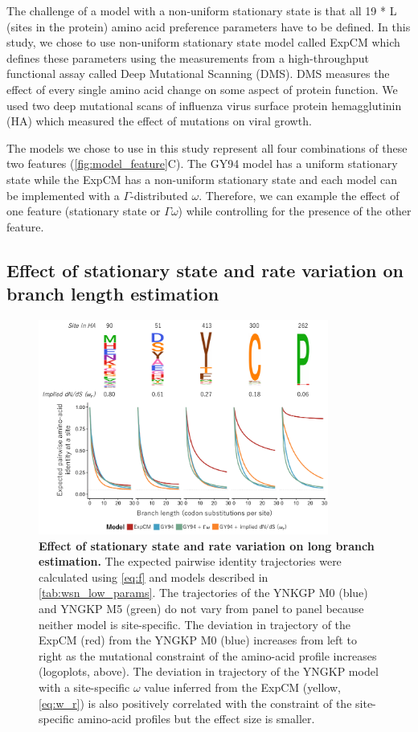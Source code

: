 \documentclass[11pt]{article}
\begin{document}
The challenge of a model with a non-uniform stationary state is that all 19 * L (sites in the protein) amino acid preference parameters have to be defined. 
In this study, we chose to use non-uniform stationary state model called ExpCM which defines these parameters using the measurements from a high-throughput functional assay called Deep Mutational Scanning (DMS). 
DMS measures the effect of every single amino acid change on some aspect of protein function. 
We used two deep mutational scans of influenza virus surface protein hemagglutinin (HA) which measured the effect of mutations on viral growth. 

The models we chose to use in this study represent all four combinations of these two features (\ref{fig:model_feature}C). 
The GY94 model has a uniform stationary state while the ExpCM has a non-uniform stationary state and each model can be implemented with a $\Gamma$-distributed $\omega$. 
Therefore, we can example the effect of one feature (stationary state or $\Gamma\omega$) while controlling for the presence of the other feature. 

\subsection*{Effect of stationary state and rate variation on branch length estimation}

\begin{figure}[H]
\centerline{\includegraphics[width=0.85\textwidth]{figures/decay.pdf}}
\caption{\label{fig:decay}
\textbf{Effect of stationary state and rate variation on long branch estimation.}
The expected pairwise identity trajectories were calculated using \ref{eq:f} and models described in \ref{tab:wsn_low_params}.
The trajectories of the YNKGP M0 (blue) and YNGKP M5 (green) do not vary from panel to panel because neither model is site-specific. 
The deviation in trajectory of the ExpCM (red) from the YNGKP M0 (blue) increases from left to right as the mutational constraint of the amino-acid profile increases (logoplots, above). 
The deviation in trajectory of the YNGKP model with a site-specific $\omega$ value inferred from the ExpCM (yellow, \ref{eq:w_r}) is also positively correlated with the constraint of the site-specific amino-acid profiles but the effect size is smaller. 
}
\end{figure}
\end{document}
